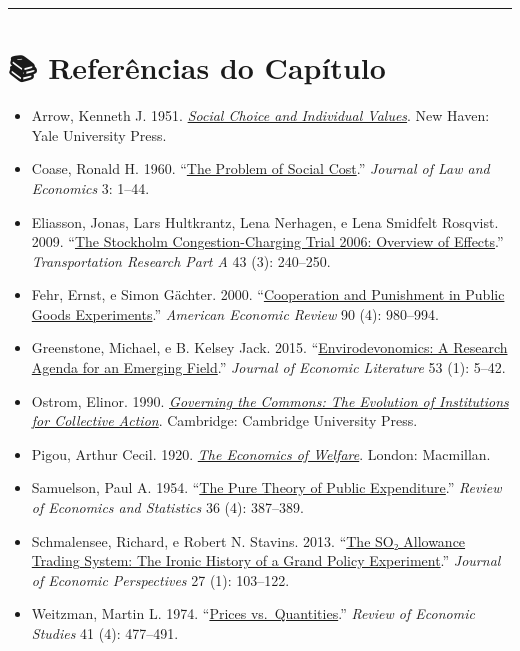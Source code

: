 \documentclass[11pt,twoside,openright]{book}
\providecommand{\tightlist}{\setlength{\itemsep}{0pt}\setlength{\parskip}{0pt}}
\begin{document}
\begin{center}\rule{0.5\linewidth}{0.5pt}\end{center}

\section{📚 Referências do
Capítulo}\label{referuxeancias-do-capuxedtulo-2}

\begin{itemize}
\tightlist
\item
  Arrow, Kenneth J. 1951.
  \href{https://books.google.com/books/about/Social_Choice_and_Individual_Values.html?id=1W0PAQAAMAAJ}{\emph{Social
  Choice and Individual Values}}. New Haven: Yale University Press.
\item
  Coase, Ronald H. 1960. ``\href{https://doi.org/10.1086/466560}{The
  Problem of Social Cost}.'' \emph{Journal of Law and Economics} 3:
  1--44.
\item
  Eliasson, Jonas, Lars Hultkrantz, Lena Nerhagen, e Lena Smidfelt
  Rosqvist. 2009. ``\href{https://doi.org/10.1016/j.tra.2008.09.007}{The
  Stockholm Congestion-Charging Trial 2006: Overview of Effects}.''
  \emph{Transportation Research Part A} 43 (3): 240--250.
\item
  Fehr, Ernst, e Simon Gächter. 2000.
  ``\href{https://doi.org/10.1257/aer.90.4.980}{Cooperation and
  Punishment in Public Goods Experiments}.'' \emph{American Economic
  Review} 90 (4): 980--994.
\item
  Greenstone, Michael, e B. Kelsey Jack. 2015.
  ``\href{https://doi.org/10.1257/jel.53.1.5}{Envirodevonomics: A
  Research Agenda for an Emerging Field}.'' \emph{Journal of Economic
  Literature} 53 (1): 5--42.
\item
  Ostrom, Elinor. 1990.
  \href{https://doi.org/10.1017/CBO9780511807763}{\emph{Governing the
  Commons: The Evolution of Institutions for Collective Action}}.
  Cambridge: Cambridge University Press.
\item
  Pigou, Arthur Cecil. 1920.
  \href{https://www.econlib.org/library/NPDBooks/Pigou/pgEW.html}{\emph{The
  Economics of Welfare}}. London: Macmillan.
\item
  Samuelson, Paul A. 1954. ``\href{https://doi.org/10.2307/1925895}{The
  Pure Theory of Public Expenditure}.'' \emph{Review of Economics and
  Statistics} 36 (4): 387--389.
\item
  Schmalensee, Richard, e Robert N. Stavins. 2013.
  ``\href{https://doi.org/10.1257/jep.27.1.103}{The SO₂ Allowance
  Trading System: The Ironic History of a Grand Policy Experiment}.''
  \emph{Journal of Economic Perspectives} 27 (1): 103--122.
\item
  Weitzman, Martin L. 1974.
  ``\href{https://doi.org/10.2307/2296698}{Prices vs.~Quantities}.''
  \emph{Review of Economic Studies} 41 (4): 477--491.
\end{itemize}

\newpage
\end{document}
